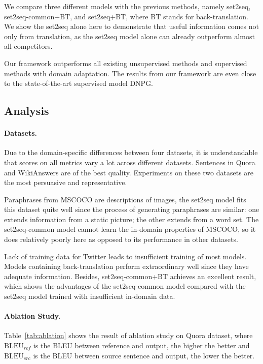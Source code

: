 We compare three different models with the previous methods, 
namely set2seq, set2seq-common+BT, and set2seq+BT, where BT stands for 
back-translation. We show the set2seq alone here to demonstrate that
useful information comes not only from translation, as the
set2seq model alone can already outperform almost all competitors. 

Our framework outperforms all existing unsupervised methods and 
supervised methods with domain adaptation. The results from our framework 
are even close to the state-of-the-art supervised model DNPG. 

\subsection{Analysis} \label{sec:analysis}
\paragraph{Datasets. } Due to the domain-specific differences between four datasets, it is understandable that scores on all metrics vary a lot across different datasets. Sentences in Quora and WikiAnswers are of the best quality.
Experiments on these two datasets are the most persuasive and representative.

Paraphrases from MSCOCO are descriptions of images, the set2seq model fits this dataset quite well since the process of generating paraphrases are similar: 
one extends information from a static picture; 
the other extends from a word set. 
The set2seq-common model cannot learn the in-domain properties of MSCOCO, 
so it does relatively poorly here as opposed to its performance 
in other datasets. 

Lack of training data for Twitter leads to insufficient training of most models. Models containing back-translation perform extraordinary well since they have adequate information. Besides, set2seq-common+BT achieves an excellent result, which shows the advantages of the set2seq-common model compared with the set2seq model trained with insufficient in-domain data.

\paragraph{Ablation Study. }

Table~\ref{tab:ablation} shows the result of ablation study on Quora dataset, where $\text{BLEU}_{ref}$ is the BLEU between reference and output, the higher the better and $\text{BLEU}_{src}$ is the BLEU between source sentence and output, the lower the better. 

